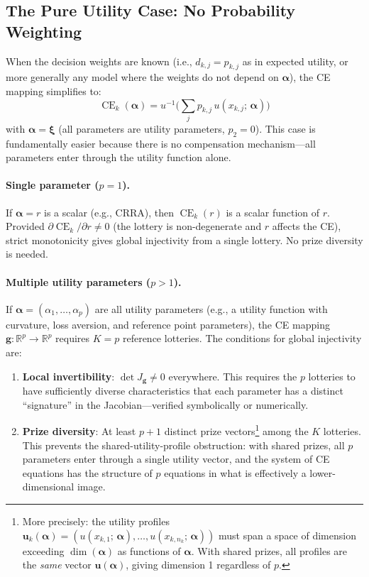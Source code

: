 \documentclass[11pt,a4paper]{article}
\theoremstyle{definition}
\DeclareMathOperator{\CE}{CE}
\begin{document}
\subsection{The Pure Utility Case: No Probability Weighting}

When the decision weights are known (i.e., $d_{k,j} = p_{k,j}$ as in expected
utility, or more generally any model where the weights do not depend on
$\bm{\alpha}$), the CE mapping simplifies to:
\begin{equation}
    \CE_k(\bm{\alpha}) = u^{-1}\!\bigg(\sum_{j} p_{k,j} \, u(x_{k,j};\,
    \bm{\alpha})\bigg)
\end{equation}
with $\bm{\alpha} = \bm{\xi}$ (all parameters are utility parameters, $p_2 = 0$).
This case is fundamentally easier because there is no compensation
mechanism---all parameters enter through the utility function alone.

\paragraph{Single parameter ($p = 1$).}
If $\bm{\alpha} = r$ is a scalar (e.g., CRRA), then $\CE_k(r)$ is a scalar
function of $r$. Provided $\partial\CE_k / \partial r \neq 0$ (the lottery is
non-degenerate and $r$ affects the CE), strict monotonicity gives global
injectivity from a single lottery. No prize diversity is needed.

\paragraph{Multiple utility parameters ($p > 1$).}
If $\bm{\alpha} = (\alpha_1, \ldots, \alpha_p)$ are all utility parameters
(e.g., a utility function with curvature, loss aversion, and reference point
parameters), the CE mapping $\mathbf{g}: \mathbb{R}^p \to \mathbb{R}^p$
requires $K = p$ reference lotteries. The conditions for global injectivity
are:
\begin{enumerate}
    \item \textbf{Local invertibility}: $\det J_{\mathbf{g}} \neq 0$
    everywhere. This requires the $p$ lotteries to have sufficiently diverse
    characteristics that each parameter has a distinct ``signature'' in the
    Jacobian---verified symbolically or numerically.

    \item \textbf{Prize diversity}: At least $p + 1$ distinct prize
    vectors\footnote{More precisely: the utility profiles
    $\mathbf{u}_k(\bm{\alpha}) = (u(x_{k,1};\,\bm{\alpha}), \ldots,
    u(x_{k,n_k};\,\bm{\alpha}))$ must span a space of dimension exceeding
    $\dim(\bm{\alpha})$ as functions of $\bm{\alpha}$. With shared prizes, all
    profiles are the \emph{same} vector $\mathbf{u}(\bm{\alpha})$, giving
    dimension 1 regardless of $p$.} among the $K$ lotteries. This prevents the
    shared-utility-profile obstruction: with shared prizes, all $p$ parameters
    enter through a single utility vector, and the system of CE equations has
    the structure of $p$ equations in what is effectively a lower-dimensional
    image.
\end{enumerate}
\end{document}
